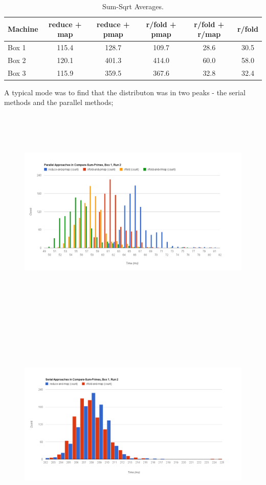 \documentclass[12pt]{article}
\begin{document}
\begin{table}[h!]
\begin{center}
\begin{tabular}{|l|c|c|c|c|c|}
\hline
Machine & reduce + map & reduce + pmap & r/fold + pmap & r/fold + r/map & r/fold\\
\hline
Box 1 & 115.4 & 128.7 & 109.7 & 28.6 & 30.5\\
Box 2 & 120.1 & 401.3 & 414.0 & 60.0 & 58.0 \\
Box 3 & 115.9 & 359.5 & 367.6 & 32.8 & 32.4\\
\hline
\end{tabular}
\end{center}
\caption{Sum-Sqrt Averages.}\label{table:sum-primes}
\end{table}

A typical mode was to find that the distributon was in two peaks - the serial methods and the parallel methods; 
\begin{figure}[h]
\includegraphics[trim = 10mm 0mm 30mm 0mm, clip, width = 16cm,height = 10cm]{PSP-B1}
\end{figure}
\begin{figure}[h!]
\includegraphics[trim = 10mm 0mm 0mm 5mm, clip, width = 16cm,height = 11cm]{SSP-B1}
\end{figure}
\end{document}
